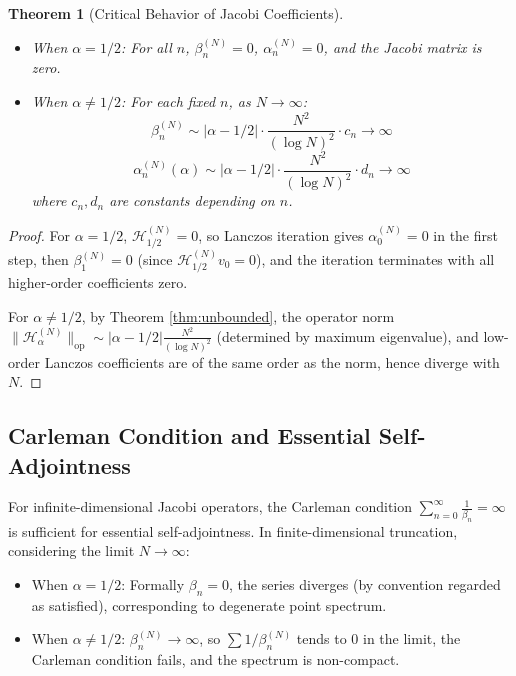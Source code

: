 \documentclass[12pt,a4paper]{amsart}
\theoremstyle{plain}
\newtheorem{theorem}{Theorem}[section]
\theoremstyle{definition}
\theoremstyle{remark}
\begin{document}
\begin{theorem}[Critical Behavior of Jacobi Coefficients]\label{thm:jacobi}

\begin{itemize}
    \item When $\alpha = 1/2$: For all $n$, $\beta_n^{(N)} = 0$, $\alpha_n^{(N)} = 0$, and the Jacobi matrix is zero.
    \item When $\alpha \neq 1/2$: For each fixed $n$, as $N \to \infty$:
    \begin{equation}
    \beta_n^{(N)} \sim |\alpha-1/2| \cdot \frac{N^2}{(\log N)^2} \cdot c_n \to \infty
    \end{equation}
    \begin{equation}
    \alpha_n^{(N)}(\alpha) \sim |\alpha-1/2| \cdot \frac{N^2}{(\log N)^2} \cdot d_n \to \infty
    \end{equation}
    where $c_n, d_n$ are constants depending on $n$.
\end{itemize}
\end{theorem}

\begin{proof}
For $\alpha=1/2$, $\mathcal{H}_{1/2}^{(N)}=0$, so Lanczos iteration gives $\alpha_0^{(N)}=0$ in the first step, then $\beta_1^{(N)}=0$ (since $\mathcal{H}_{1/2}^{(N)}v_0 = 0$), and the iteration terminates with all higher-order coefficients zero.

For $\alpha \neq 1/2$, by Theorem \ref{thm:unbounded}, the operator norm $\|\mathcal{H}_\alpha^{(N)}\|_{\mathrm{op}} \sim |\alpha-1/2| \frac{N^2}{(\log N)^2}$ (determined by maximum eigenvalue), and low-order Lanczos coefficients are of the same order as the norm, hence diverge with $N$.
\end{proof}

\subsection{Carleman Condition and Essential Self-Adjointness}

For infinite-dimensional Jacobi operators, the Carleman condition $\sum_{n=0}^\infty \frac{1}{\beta_n} = \infty$ is sufficient for essential self-adjointness. In finite-dimensional truncation, considering the limit $N\to\infty$:

\begin{itemize}
    \item When $\alpha = 1/2$: Formally $\beta_n=0$, the series diverges (by convention regarded as satisfied), corresponding to degenerate point spectrum.
    \item When $\alpha \neq 1/2$: $\beta_n^{(N)}\to\infty$, so $\sum 1/\beta_n^{(N)}$ tends to 0 in the limit, the Carleman condition fails, and the spectrum is non-compact.
\end{itemize}
\end{document}
